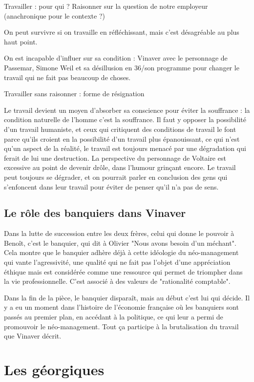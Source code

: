 \documentclass[a4paper,12pt]{book}
\begin{document}
\par Travailler : pour qui ? Raisonner sur la question de notre employeur (anachronique pour le contexte ?)
\par On peut survivre si on travaille en réfléchissant, mais c'est désagréable au plus haut point.
\par On est incapable d'influer sur sa condition : Vinaver avec le personnage de Passemar, Simone Weil et sa désillusion en 36/son programme pour changer le travail qui ne fait pas beaucoup de choses.
\par Travailler sans raisonner : forme de résignation
\par Le travail devient un moyen d'absorber sa conscience pour éviter la souffrance : la condition naturelle de l'homme c'est la souffrance. Il faut y opposer la possibilité d'un travail humaniste, et ceux qui critiquent des conditions de travail le font parce qu'ils croient en la possibilité d'un travail plus épanouissant, ce qui n'est qu'un aspect de la réalité, le travail est toujours menacé par une dégradation qui ferait de lui une destruction. La perspective du personnage de Voltaire est excessive au point de devenir drôle, dans l'humour grinçant encore. Le travail peut toujours se dégrader, et on pourrait parler en conclusion des gens qui s'enfoncent dans leur travail pour éviter de penser qu'il n'a pas de sens.

\section{Le rôle des banquiers dans Vinaver}
Dans la lutte de succession entre les deux frères, celui qui donne le pouvoir à Benoît, c'est le banquier, qui dit à Olivier "Nous avons besoin d'un méchant". Cela montre que le banquier adhère déjà à cette idéologie du néo-management qui vante l'agressivité, une qualité qui ne fait pas l'objet d'une appréciation éthique mais est considérée comme une ressource qui permet de triompher dans la vie professionnelle. C'est associé à des valeurs de "rationalité comptable".
\par Dans la fin de la pièce, le banquier disparaît, mais au début c'est lui qui décide. Il y a eu un moment dans l'histoire de l'économie française où les banquiers sont passés au premier plan, en accédant à la politique, ce qui leur a permi de promouvoir le néo-management. Tout ça participe à la brutalisation du travail que Vinaver décrit.


\chapter{Les géorgiques}
\end{document}
